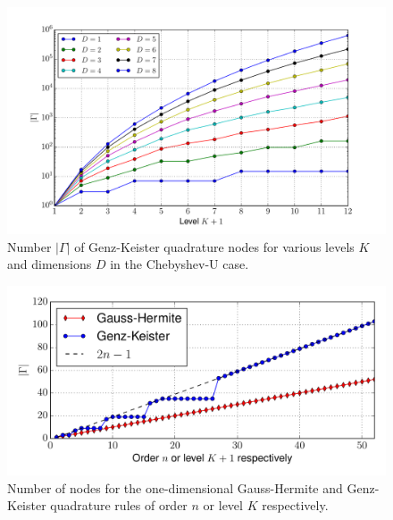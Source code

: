 \documentclass[a4paper,10pt]{article}
\begin{document}
\begin{figure}
  \centering
  \includegraphics[width=\linewidth]{./img/number_nodes_levdim_chebyshevu.pdf}
  \caption{Number $|\Gamma|$ of Genz-Keister quadrature nodes for various
  levels $K$ and dimensions $D$ in the Chebyshev-U case.}
  \label{fig:number_nodes_levdim_chebyshevu}
\end{figure}

\begin{figure}
  \centering
  \includegraphics[width=\linewidth]{./img/number_nodes_hermitephy.pdf}
  \caption{Number of nodes for the one-dimensional Gauss-Hermite and Genz-Keister quadrature
  rules of order $n$ or level $K$ respectively.}
  \label{fig:number_nodes_hermitephy}
\end{figure}
\end{document}
